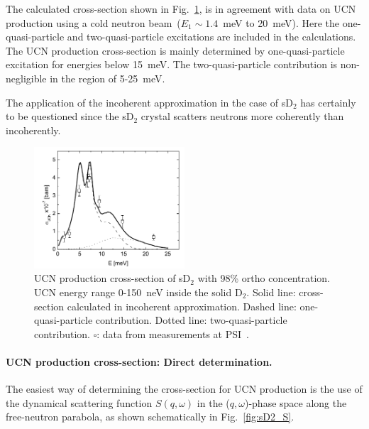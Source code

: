 The calculated cross-section shown in
Fig.~\ref{fig:Frei2010_sigma_G1}, is in agreement with data on UCN
production using a cold neutron beam~($E_1 \sim 1.4$~meV to 20~meV).
Here the one-quasi-particle and two-quasi-particle excitations are
included in the calculations.  The UCN production cross-section is
mainly determined by one-quasi-particle excitation for energies below
15~meV. The two-quasi-particle contribution is non-negligible in the
region of 5-25~meV.

The application of the incoherent approximation in the case of sD$_2$
has certainly to be questioned since the sD$_2$ crystal scatters
neutrons more coherently than incoherently.

\begin{figure}[h!]
\begin{center}
   \includegraphics[width=0.5\textwidth]{Frei2010_sigma_G1.PNG} \caption{UCN
    production cross-section of sD$_2$ with 98\% ortho
    concentration. UCN energy range 0-150~neV inside the solid
    D$_2$. Solid line: cross-section calculated in incoherent
    approximation. Dashed line: one-quasi-particle
    contribution. Dotted line: two-quasi-particle
    contribution. $\square$: data from measurements at
    PSI~\cite{Atchison2007}.  }
    \label{fig:Frei2010_sigma_G1}
    \end{center}
\end{figure} 




\paragraph{UCN production cross-section: Direct determination.}
The easiest way of determining the cross-section for UCN production is
the use of the dynamical scattering function $S(q,\omega)$ in the
($q,\omega$)-phase space along the free-neutron parabola, as shown
schematically in Fig.~\ref{fig:sD2_S}.

